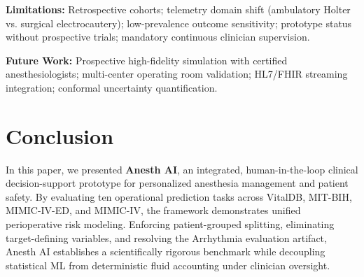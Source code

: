 \documentclass[conference]{IEEEtran}
\begin{document}
\textbf{Limitations:} Retrospective cohorts; telemetry domain shift (ambulatory Holter vs. surgical electrocautery); low-prevalence outcome sensitivity; prototype status without prospective trials; mandatory continuous clinician supervision.

\textbf{Future Work:} Prospective high-fidelity simulation with certified anesthesiologists; multi-center operating room validation; HL7/FHIR streaming integration; conformal uncertainty quantification.

\section{Conclusion}
In this paper, we presented \textbf{Anesth AI}, an integrated, human-in-the-loop clinical decision-support prototype for personalized anesthesia management and patient safety. By evaluating ten operational prediction tasks across VitalDB, MIT-BIH, MIMIC-IV-ED, and MIMIC-IV, the framework demonstrates unified perioperative risk modeling. Enforcing patient-grouped splitting, eliminating target-defining variables, and resolving the Arrhythmia evaluation artifact, Anesth AI establishes a scientifically rigorous benchmark while decoupling statistical ML from deterministic fluid accounting under clinician oversight.
\end{document}
